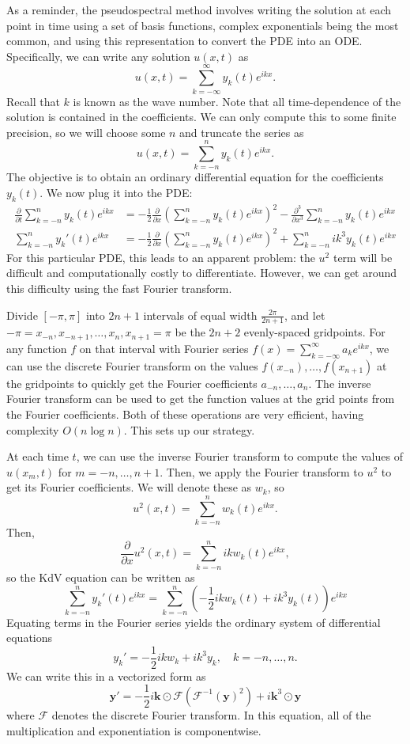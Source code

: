 As a reminder, the pseudospectral method involves writing the solution at each point in time using a set of basis functions, complex exponentials being the most common, and using this representation to convert the PDE into an ODE.
Specifically, we can write any solution \(u(x,t)\) as
\[
u(x,t) = \sum_{k=-\infty}^\infty y_k(t)e^{ikx}.
\]
Recall that \(k\) is known as the wave number.
Note that all time-dependence of the solution is contained in the coefficients.
We can only compute this to some finite precision, so we will choose some \(n\) and truncate the series as
\[
u(x,t) = \sum_{k=-n}^n y_k(t)e^{ikx}.
\]
The objective is to obtain an ordinary differential equation for the coefficients \(y_k(t)\).
We now plug it into the PDE:
\begin{align*}
\frac{\partial}{\partial t}\sum_{k=-n}^n y_k(t)e^{ikx}
&=
-\frac{1}{2} \frac{\partial}{\partial x}\left(
\sum_{k=-n}^n y_k(t)e^{ikx}
\right)^2
-
\frac{\partial^3}{\partial x^3}\sum_{k=-n}^n y_k(t)e^{ikx}
\\
\sum_{k=-n}^n y_k'(t)e^{ikx}
&=
-\frac{1}{2} \frac{\partial}{\partial x}\left(
\sum_{k=-n}^n y_k(t)e^{ikx}
\right)^2
+
\sum_{k=-n}^n ik^3 y_k(t)e^{ikx}
\end{align*}
For this particular PDE, this leads to an apparent problem: the \(u^2\) term will be difficult and computationally costly to differentiate.
However, we can get around this difficulty using the fast Fourier transform.

Divide \([-\pi, \pi]\) into \(2n+1\) intervals of equal width \(\frac{2\pi}{2n+1}\), and let \(-\pi=x_{-n},x_{-n+1},\ldots,x_n,x_{n+1}=\pi\) be the \(2n+2\) evenly-spaced gridpoints.
For any function \(f\) on that interval with Fourier series \(f(x)=\sum_{k=-\infty}^\infty a_k e^{ikx}\), we can use the discrete Fourier transform on the values \(f(x_{-n}),\ldots,f(x_{n+1})\) at the gridpoints to quickly get the Fourier coefficients \(a_{-n},\ldots, a_n\).
The inverse Fourier transform can be used to get the function values at the grid points from the Fourier coefficients.
Both of these operations are very efficient, having complexity \(O(n\log n)\).
This sets up our strategy.

At each time \(t\), we can use the inverse Fourier transform to compute the values of \(u(x_m,t)\) for \(m=-n,\ldots,n+1\).
Then, we apply the Fourier transform to \(u^2\) to get its Fourier coefficients.
We will denote these as \(w_k\), so
\[
u^2(x,t)=\sum_{k=-n}^n w_k(t) e^{ikx}.
\]
Then,
\[
\frac{\partial}{\partial x}
u^2(x,t)=\sum_{k=-n}^n ik w_k(t) e^{ikx},
\]
so the KdV equation can be written as
\[
\sum_{k=-n}^n y_k'(t)e^{ikx}
=
\sum_{k=-n}^n \left(
-\frac{1}{2}ikw_k(t)
+
ik^3 y_k(t)
\right)e^{ikx}
\]
Equating terms in the Fourier series yields the ordinary system of differential equations
\[
y_k' = -\frac{1}{2}ikw_k + ik^3 y_k, \quad k=-n,\ldots, n.
\]
We can write this in a vectorized form as
\begin{equation}
\mathbf{y}' = -\frac{1}{2}i\mathbf{k}\odot\mathcal{F}(\mathcal{F}^{-1}(\mathbf{y})^2) + i\mathbf{k}^3 \odot\mathbf{y}
\label{lab:solitons:pseudospectral}
\end{equation}
where \(\mathcal{F}\) denotes the discrete Fourier transform.
In this equation, all of the multiplication and exponentiation is componentwise.

